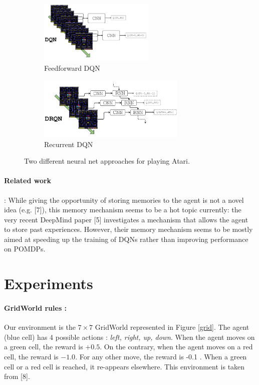 \documentclass{article} %
\begin{document}
	\begin{figure}
		\begin{subfigure}[b]{.45\linewidth}
			\centering
			\includegraphics[height=3cm]{imgs/DQN.png}
			\caption{Feedforward DQN}
			\label{fig:a}
		\end{subfigure}
		\begin{subfigure}[b]{.45\linewidth}
			\centering
			\includegraphics[height=3cm]{imgs/DRQN.png}
			\caption{Recurrent DQN}
			\label{fig:b}
		\end{subfigure}
		\caption{Two different neural net approaches for playing Atari.}\label{fig:1}
	\end{figure}
	
	
	
	\paragraph{Related work}: While giving the opportunity of storing memories to the agent is not a novel idea (e.g. [7]), this memory mechanism seems to be a hot topic currently:
	the very recent DeepMind paper [5] investigates a mechanism that allows the agent to store past experiences. However, their memory mechanism seems to be mostly aimed at speeding up the training of DQNs rather than improving performance on POMDPs.
	
	\section{Experiments}
	
	\paragraph{GridWorld rules :} Our environment is the $7 \times 7$ GridWorld represented in Figure \ref{grid}. The agent (blue cell) has 4 possible actions : \textit{left, right, up, down}. When the agent moves on a green cell, the reward is  $+0.5$. On the contrary, when the agent moves on a red cell, the reward is  $-1.0$. For any other move, the reward is  -0.1 . When a green cell or a red cell is reached, it re-appears elsewhere. This environment is taken from [8].
	
\end{document}
